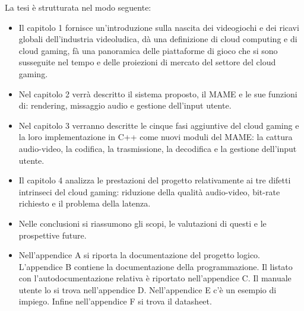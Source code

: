 La tesi è strutturata nel modo seguente:
\begin{itemize}
	\item Il capitolo 1 fornisce un'introduzione sulla nascita dei videogiochi e dei ricavi globali dell'industria videoludica, dà una definizione di cloud computing e di cloud gaming, fà una panoramica delle piattaforme di gioco che si sono susseguite nel tempo e delle proiezioni di mercato del settore del cloud gaming.
	\item Nel capitolo 2 verrà descritto il sistema proposto, il MAME e le sue funzioni di: rendering, missaggio audio e gestione dell'input utente.
	\item Nel capitolo 3 verranno descritte le cinque fasi aggiuntive del cloud gaming e la loro implementazione in C++ come nuovi moduli del MAME: la cattura audio-video, la codifica, la trasmissione, la decodifica e la gestione dell'input utente.
	\item Il capitolo 4 analizza le prestazioni del progetto relativamente ai tre difetti intrinseci del cloud gaming: riduzione della qualità audio-video, bit-rate richiesto e il problema della latenza.
	\item Nelle conclusioni si riassumono gli scopi, le valutazioni di questi e le prospettive future.
	\item Nell'appendice A si riporta la documentazione del progetto logico. L'appendice B contiene la documentazione della programmazione. Il listato con l’autodocumentazione relativa è riportato nell'appendice C. Il manuale utente lo si trova nell'appendice D. Nell'appendice E c'è un esempio di impiego. Infine nell'appendice F si trova il datasheet.
\end{itemize}